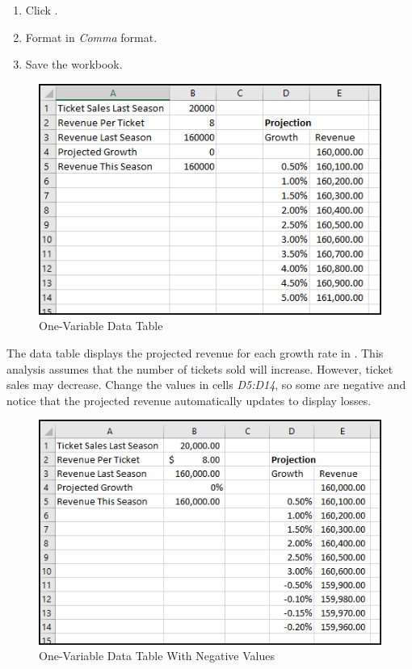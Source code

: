 \begin{enumbox}
\begin{enumerate}
		\item Click .
		\item Format  in \textit{Comma} format.
		\item Save the  workbook.
	\end{enumerate}
\end{enumbox}

\begin{figure}[H]
	\centering
	\includegraphics[width=\maxwidth{.95\linewidth}]{gfx/ch08_fig42}
	\caption{One-Variable Data Table}
	\label{08:fig42}
\end{figure}

The data table displays the projected revenue for each growth rate in . This analysis assumes that the number of tickets sold will increase. However, ticket sales may decrease. Change the values in cells \textit{D5:D14}, so some are negative and notice that the projected revenue automatically updates to display losses.

\begin{figure}[H]
	\centering
	\includegraphics[width=\maxwidth{.95\linewidth}]{gfx/ch08_fig43}
	\caption{One-Variable Data Table With Negative Values}
	\label{08:fig43}
\end{figure}
	
